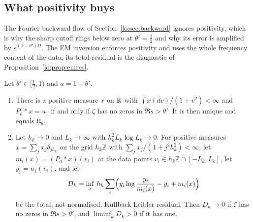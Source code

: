 \subsection{What positivity buys}

The Fourier backward flow of Section~\ref{lo:sec:backward} ignores positivity, which is why the sharp cutoff rings below zero at $\theta'=\tfrac12$ and why its error is amplified by $e^{(1-\theta')\Omega}$. The EM inversion enforces positivity and uses the whole frequency content of the data; its total residual is the diagnostic of Proposition~\ref{lo:prop:emres}.

\begin{proposition}\label{lo:prop:emres}
Let $\theta'\in[\tfrac12,1)$ and $a=1-\theta'$.
\begin{enumerate}
\item[(a)] There is a positive measure $x$ on $\mathbb{R}$ with $\int x(dv)/(1+v^2)<\infty$ and $P_a*x=u_1$ if and only if $\zeta$ has no zeros in $\Re s>\theta'$. It is then unique and equals $\mathfrak U_{\theta'}$.
\item[(b)] Let $h_k\to0$ and $L_k\to\infty$ with $h_k^2L_k\log L_k\to0$. For positive measures $x=\sum_jx_j\delta_{jh_k}$ on the grid $h_k\mathbb Z$ with $\sum_jx_j/(1+j^2h_k^2)<\infty$, let $m_i(x)=(P_a*x)(v_i)$ at the data points $v_i\in h_k\mathbb Z\cap[-L_k,L_k]$, let $y_i=u_1(v_i)$, and let
\[
D_k=\inf_x\,h_k\sum_i\Bigl(y_i\log\frac{y_i}{m_i(x)}-y_i+m_i(x)\Bigr)
\]
be the total, not normalised, Kullback Leibler residual. Then $D_k\to0$ if $\zeta$ has no zeros in $\Re s>\theta'$, and $\liminf_kD_k>0$ if it has one.
\end{enumerate}
\end{proposition}

